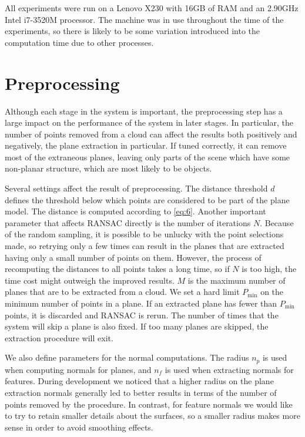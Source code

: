\documentclass[11pt,a4paper]{kth-mag}
\begin{document}
All experiments were run on a Lenovo X230 with 16GB of RAM and an 2.90GHz Intel
i7-3520M processor. The machine was in use throughout the time of the
experiments, so there is likely to be some variation introduced into the
computation time due to other processes.

\section{Preprocessing}
Although each stage in the system is important, the preprocessing step has a
large impact on the performance of the system in later stages. In particular,
the number of points removed from a cloud can affect the results both positively
and negatively, the plane extraction in particular. If tuned correctly, it can
remove most of the extraneous planes, leaving only parts of the scene which have
some non-planar structure, which are most likely to be objects. 

Several settings affect the result of preprocessing. The distance threshold $d$
defines the threshold below which points are considered to be part of the plane
model. The distance is computed according to \eqref{eq:6}. Another
important parameter that affects RANSAC directly is the number of iterations
$N$. Because of the random sampling, it is possible to be unlucky with the point
selections made, so retrying only a few times can result in the planes that are
extracted having only a small number of points on them. However, the process of
recomputing the distances to all points takes a long time, so if $N$ is too
high, the time cost might outweigh the improved results. $M$ is the maximum
number of planes that are to be extracted from a cloud. We set a hard limit
$P_{\min}$ on the minimum number of points in a plane. If an extracted plane has
fewer than $P_{\min}$ points, it is discarded and RANSAC is rerun. The number of
times that the system will skip a plane is also fixed. If too many planes are
skipped, the extraction procedure will exit.

We also define parameters for the normal computations. The radius $n_p$ is used
when computing normals for planes, and $n_f$ is used when extracting normals for
features. During development we noticed that a higher radius on the plane
extraction normals generally led to better results in terms of the number of
points removed by the procedure. In contrast, for feature normals we would like
to try to retain smaller details about the surfaces, so a smaller radius makes
more sense in order to avoid smoothing effects.
\end{document}
